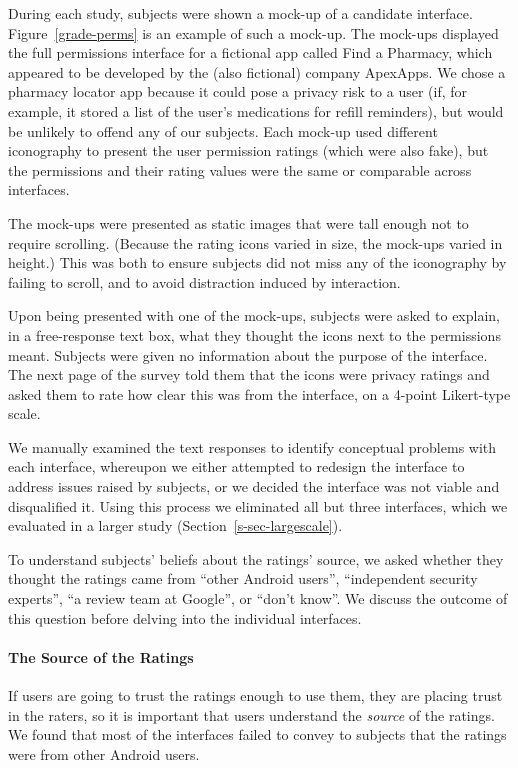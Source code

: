 \documentclass[11pt]{article}
\newcommand{\reffig}[1]{Figure~\ref{#1}}
\newcommand{\refsec}[1]{Section~\ref{#1}}
\begin{document}
During each study, subjects were shown a mock-up of
a candidate interface. \reffig{grade-perms}
is an example of such a mock-up. The mock-ups displayed the full permissions
interface for a fictional app called Find a Pharmacy, which appeared 
to be developed by the (also fictional) company ApexApps. 
We chose a pharmacy locator app because it 
could pose a privacy risk to a user (if, for example, it stored a list
of the user's medications for refill reminders), but 
would be unlikely to offend any of
our subjects. Each mock-up used different iconography to
present the user permission ratings (which were also fake), but the permissions
and their rating values were the same or comparable across interfaces. 

The mock-ups were presented as static images that were tall enough
not to require scrolling. (Because the rating icons
varied in size, the mock-ups varied in height.) This was both
to ensure subjects did not miss any of the iconography by failing to
scroll, and to avoid distraction induced by interaction.

Upon being presented with one of the mock-ups, subjects were
asked to explain, in a free-response text box, 
what they thought the icons next to the permissions 
meant. Subjects were given no information about the 
purpose of the interface. The next page of the survey 
told them that the icons were privacy 
ratings and asked them to rate how clear this was from 
the interface, on a 4-point Likert-type scale. 

We manually examined 
the text responses to identify conceptual problems with each 
interface, whereupon we either attempted 
to redesign the interface to address issues raised by subjects, 
or we decided the interface was not viable and disqualified it.
Using this process we eliminated all but three interfaces, which we evaluated
in a larger study (\refsec{s-sec-largescale}).

To understand subjects' beliefs about the ratings' source, we asked
whether they thought the ratings came from 
 ``other Android users'', ``independent 
security experts'', ``a review team at Google'', or
``don't know''. We discuss the outcome of this question
before delving into the individual interfaces.


\paragraph{The Source of the Ratings}
\label{subsec-small-source}

If users are going to trust the ratings enough to use them, 
they are placing trust in the raters, so it is
important that users understand the \emph{source}
of the ratings. 
We found that most of the interfaces failed to
convey to subjects that the ratings were from other Android users.
\end{document}
